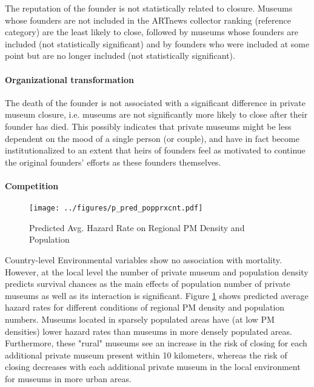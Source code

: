 \documentclass[12pt]{article}
\begin{document}
The reputation of the founder is not statistically related to closure. 
Museums whose founders are not included in the ARTnews collector ranking (reference category) are the least likely to close, followed by museums whose founders are included (not statistically significant) and by founders who were included at some point but are no longer included (not statistically significant).

\paragraph*{Organizational transformation}


The death of the founder is not associated with a significant difference in private museum closure, i.e. museums are not significantly more likely to close after their founder has died.
This possibly indicates that private museums might be less dependent on the mood of a single person (or couple), and have in fact become institutionalized to an extent that heirs of founders feel as motivated to continue the original founders' efforts as these founders themselves.

\paragraph*{Competition}

\begin{figure}[htbp]
\centering
\texttt{[image: ../figures/p\_pred\_popprxcnt.pdf]}
\caption{\label{fig:p_pred_popprxcnt}Predicted Avg. Hazard Rate on Regional PM Density and Population}
\end{figure}



Country-level Environmental variables show no association with mortality.
However, at the local level the number of private museum and population density predicts survival chances as the main effects of population number of private museums as well as its interaction is significant.
Figure \ref{fig:p_pred_popprxcnt} shows predicted average hazard rates for different conditions of regional PM density and population numbers.
Museums located in sparsely populated areas have (at low PM densities) lower hazard rates than museums in more densely populated areas. 
Furthermore, these "rural" museums see an increase in the risk of closing for each additional private museum present within 10 kilometers, whereas the risk of closing decreases with  each additional private museum in the local environment for museums in more urban areas. 
\end{document}
